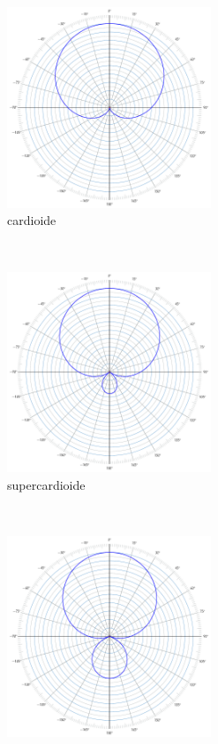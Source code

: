\begin{figure}[h]
\begin{subfigure}[t]{0.48\textwidth}
        \centering
        \includegraphics[height=6cm]{CAPITOLI/_TIKZ/POLAR/cardioid}
        \caption{cardioide}%
        \label{pol:cardio-p}
    \end{subfigure}
    ~
    \begin{subfigure}[t]{0.48\textwidth}
        \centering
        \includegraphics[height=6cm]{CAPITOLI/_TIKZ/POLAR/supercardioid}
        \caption{supercardioide}%
        \label{pol:super-p}
    \end{subfigure}
    \\
    \begin{subfigure}[t]{0.48\textwidth}
        \centering
        \includegraphics[height=6cm]{CAPITOLI/_TIKZ/POLAR/hypercardioid}

\end{subfigure}
\end{figure}
